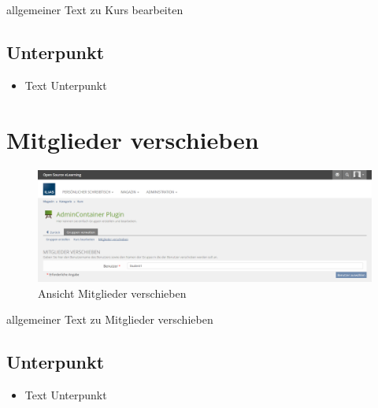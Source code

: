 allgemeiner Text zu Kurs bearbeiten
\subsection*{Unterpunkt}
\begin{itemize}
	\item Text Unterpunkt
\end{itemize}

\clearpage

\section{Mitglieder verschieben}
\begin{figure}
	\centering
	\includegraphics[width=1\textwidth]{img/mitgliederVerschieben.png}
	\caption{Ansicht Mitglieder verschieben}
\end{figure}

allgemeiner Text zu Mitglieder verschieben
\subsection*{Unterpunkt}
\begin{itemize}
	\item Text Unterpunkt
\end{itemize}

\clearpage